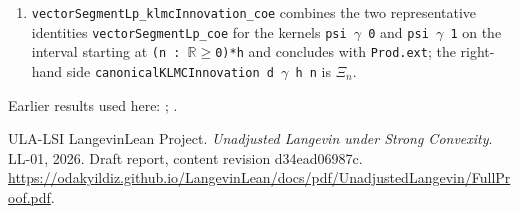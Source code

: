 \documentclass[11pt,a4paper]{article}
\begin{document}
\begin{leanbox}
\begin{enumerate}
\item \texttt{vector\allowbreak{}Segment\allowbreak{}Lp\_\allowbreak{}klmc\allowbreak{}Innovation\_\allowbreak{}coe} combines the two representative identities \texttt{vector\allowbreak{}Segment\allowbreak{}Lp\_\allowbreak{}coe} for the kernels \texttt{psi \ensuremath{\gamma} 0} and \texttt{psi \ensuremath{\gamma} 1} on the interval starting at \texttt{(n : \ensuremath{\mathbb R}\ensuremath{\ge}0)*h} and concludes with \texttt{Prod.\allowbreak{}ext}; the right-hand side \texttt{canonical\allowbreak{}KLMCInnovation d \ensuremath{\gamma} h n} is \(\Xi_n\).

\end{enumerate}
\end{leanbox}


Earlier results used here: \cite[Section~3.8.16]{LangevinLean2026ULASC}; \cite[Section~3.8.17]{LangevinLean2026ULASC}.

\begin{thebibliography}{ULA-LSI}
LangevinLean Project. \emph{Unadjusted Langevin under Strong Convexity}. LL-01, 2026. Draft report, content revision d34ead06987c. \url{https://odakyildiz.github.io/LangevinLean/docs/pdf/UnadjustedLangevin/FullProof.pdf}.
\end{thebibliography}
\end{document}
